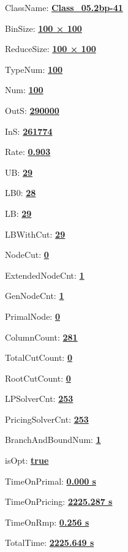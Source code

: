 \documentclass[11pt]{article}
\begin{document}
\pagestyle{empty}


ClassName: \underline{\textbf{Class_05.2bp-41}}
\par
BinSize: \underline{\textbf{100 × 100}}
\par
ReduceSize: \underline{\textbf{100 × 100}}
\par
TypeNum: \underline{\textbf{100}}
\par
Num: \underline{\textbf{100}}
\par
OutS: \underline{\textbf{290000}}
\par
InS: \underline{\textbf{261774}}
\par
Rate: \underline{\textbf{0.903}}
\par
UB: \underline{\textbf{29}}
\par
LB0: \underline{\textbf{28}}
\par
LB: \underline{\textbf{29}}
\par
LBWithCut: \underline{\textbf{29}}
\par
NodeCut: \underline{\textbf{0}}
\par
ExtendedNodeCnt: \underline{\textbf{1}}
\par
GenNodeCnt: \underline{\textbf{1}}
\par
PrimalNode: \underline{\textbf{0}}
\par
ColumnCount: \underline{\textbf{281}}
\par
TotalCutCount: \underline{\textbf{0}}
\par
RootCutCount: \underline{\textbf{0}}
\par
LPSolverCnt: \underline{\textbf{253}}
\par
PricingSolverCnt: \underline{\textbf{253}}
\par
BranchAndBoundNum: \underline{\textbf{1}}
\par
isOpt: \underline{\textbf{true}}
\par
TimeOnPrimal: \underline{\textbf{0.000 s}}
\par
TimeOnPricing: \underline{\textbf{2225.287 s}}
\par
TimeOnRmp: \underline{\textbf{0.256 s}}
\par
TotalTime: \underline{\textbf{2225.649 s}}
\par
\newpage


\end{document}
